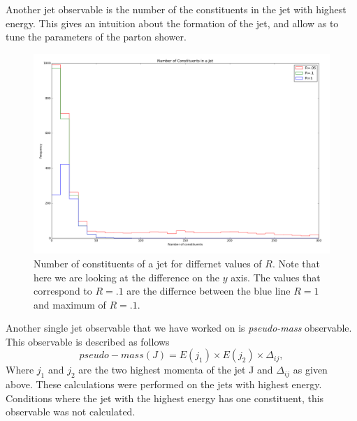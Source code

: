 Another jet observable is the number of the constituents in the jet with highest energy.  This gives an intuition about the formation of the jet, and allow as to tune the parameters of the parton shower.
\begin{figure}[hbtp]
\centering
\includegraphics[scale=.3]{images/figure_12.png}
\caption{Number of constituents of a jet for differnet  values of $R$.  Note that here we are looking at the difference on the $y$ axis. The values that correspond to $R = .1$ are the differnce between the blue line $R = 1$ and maximum of $R = .1$.}\label{nofcon}
\end{figure}


Another single jet observable that we have worked on is \textit{pseudo-mass} observable. This observable is described as follows \begin{equation}
pseudo-mass(J) = E(j_1) \times E(j_2) \times \Delta_{ij} ,
\end{equation}   Where $j_1$ and $j_2$ are the two highest  momenta of the jet J and $\Delta_{ij}$ as given above. These calculations were performed on the jets with highest energy. Conditions where the jet with the highest energy has one constituent, this observable was not calculated.


